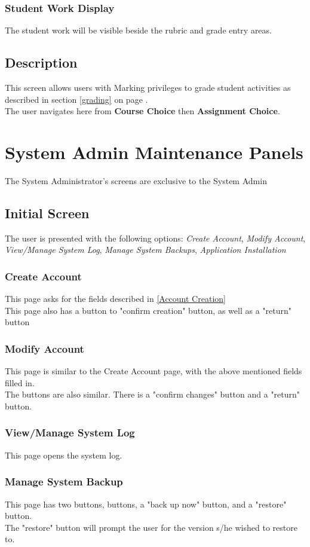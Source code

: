 \documentclass{article}
\begin{document}
\subsubsection{Student Work Display}
The student work will be visible beside the rubric and grade entry areas.
\subsection{Description}
This screen allows users with Marking privileges to grade student activities
as described in section \ref{grading} on page \pageref{grading}.\\
The user navigates here from \textbf{Course Choice} then \textbf{Assignment Choice}.

\section{System Admin Maintenance Panels}
The System Administrator's screens are exclusive to the System Admin
\subsection{Initial Screen}
The user is presented with the following options: 
\emph{Create Account}, \emph{Modify Account}, \emph{View/Manage System Log}, \emph{Manage System Backups}, \emph{Application Installation}
\subsubsection{Create Account}
This page asks for the fields described in \ref{Account Creation} \\
This page also has a button to "confirm creation" button, as well as a "return" button
\subsubsection{Modify Account}
This page is similar to the Create Account page, with the above mentioned fields filled in. \\
The buttons are also similar. There is a "confirm changes" button and a "return" button.
\subsubsection{View/Manage System Log}
This page opens the system log. 
\subsubsection{Manage System Backup}
This page has two buttons, buttons, a "back up now" button, and a "restore" button. \\
The "restore" button will prompt the user for the version s/he wished to restore to.
\end{document}
